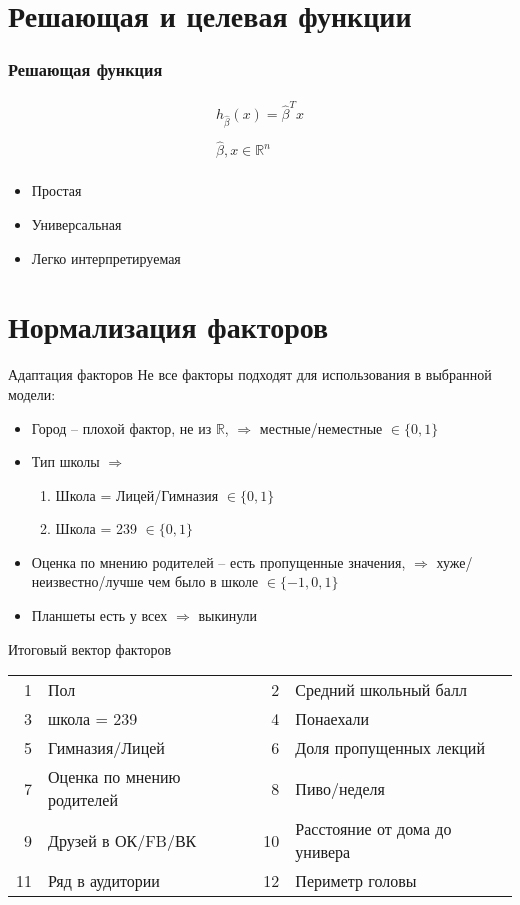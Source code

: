 \documentclass[14pt, fleqn, xcolor={dvipsnames, table}, hyperref={unicode}, babel={english,russian}, inputenc=utf8x]{beamer}
\begin{document}
\section{Решающая и целевая функции}
\begin{frame}[t]\frametitle{Решающая функция}
    $$\begin{array}{c}
      h_{\hat{\beta}}(x) = \hat{\beta}^{T}x \\
      \\
      \hat{\beta}, x \in \mathbb{R}^n \\
      \end{array}
    $$
\begin{itemize}
  \item Простая
  \item Универсальная
  \item Легко интерпретируемая
\end{itemize}
\end{frame}

\section{Нормализация факторов}
\begin{frame}{Адаптация факторов}
Не все факторы подходят для использования в выбранной модели:
\begin{itemize}
  \item Город -- плохой фактор, не из $\mathbb{R}$, $\Rightarrow$ местные/неместные $\in \{0,1\}$
  \item Тип школы $\Rightarrow$
  \begin{enumerate}
    \item Школа = Лицей/Гимназия $\in \{0,1\}$
    \item Школа = 239 $\in \{0,1\}$
  \end{enumerate}
  \item Оценка по мнению родителей -- есть пропущенные значения, $\Rightarrow$ хуже/неизвестно/лучше чем было в школе $\in \{-1,0,1\}$
  \item Планшеты есть у всех $\Rightarrow$ выкинули
\end{itemize}
\end{frame}

\begin{frame}{Итоговый вектор факторов}
\begin{center}
\footnotesize
\begin{tabular}{rlrl}
1 & Пол & 2 & Средний школьный балл \\
3 & школа = 239 & 4 & Понаехали \\
5 & Гимназия/Лицей & 6 & Доля пропущенных лекций \\
7 & Оценка по мнению родителей & 8 & Пиво/неделя \\
9 & Друзей в ОК/FB/ВК & 10 & Расстояние от дома до универа \\
11 & Ряд в аудитории & 12 & Периметр головы
\end{tabular}
\end{center}
\end{frame}
\end{document}
